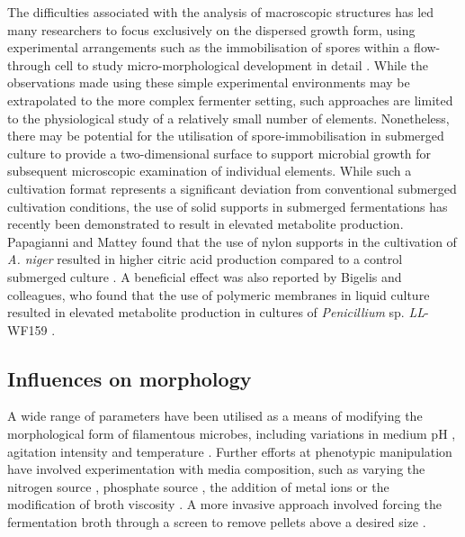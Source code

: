 The difficulties associated with the analysis of macroscopic structures has led many researchers to focus exclusively on the dispersed growth form, using experimental arrangements such as the immobilisation of spores within a flow-through cell to study micro-morphological development in detail \cite{spohr1998,eypark2006,lubbehusen2004}. While the observations made using these simple experimental environments may be extrapolated to the more complex fermenter setting, such approaches are limited to the physiological study of a relatively small number of elements. Nonetheless, there may be potential for the utilisation of spore-immobilisation in submerged culture to provide a two-dimensional surface to support microbial growth for subsequent microscopic examination of individual elements. While such a cultivation format represents a significant deviation from conventional submerged cultivation conditions, the use of solid supports in submerged fermentations has recently been demonstrated to result in elevated metabolite production. Papagianni and Mattey found that the use of nylon supports in the cultivation of \emph{A. niger} resulted in higher citric acid production compared to a control submerged culture \cite{papagianni2004}. A beneficial effect was also reported by Bigelis and colleagues, who found that the use of polymeric membranes in liquid culture resulted in elevated metabolite production in cultures of \emph{Penicillium} sp. \emph{LL}-WF159 \cite{bigelis2006}.

\subsection{Influences on morphology}

A wide range of parameters have been utilised as a means of modifying the morphological form of filamentous microbes, including variations in medium pH \cite{hwang2004,dynesen2003}, agitation intensity \cite{papagianni1998,amanullah1999,amanullah2001,amanullah2002,rodriguezporcel2005,jppark2002,elenshasy2006} and temperature \cite{cpark2007}. Further efforts at phenotypic manipulation have involved experimentation with media composition, such as varying the nitrogen source \cite{cpark2007,nahas2002,truong2004}, phosphate source \cite{cpark2007}, the addition of metal ions \cite{couri2003,dobson2008a,kisser1980} or the modification of broth viscosity \cite{ocleirigh2005,papagianni2001}. A more invasive approach involved forcing the fermentation broth through a screen to remove pellets above a desired size \cite{shu2005}.


